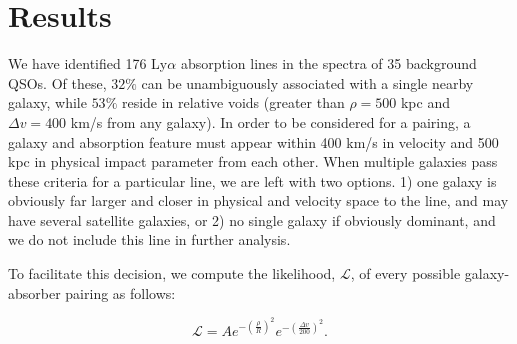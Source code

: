 \documentclass[iop]{emulateapj-rtx4}
\begin{document}
\begin{table}[ht]
\begin{center}
\end{center}
  \caption{\small{All associated systems. The largest $\mathcal{L}$ value is given, where a (\**) indicates $d^{1.5}$ was used, otherwise the quoted $\mathcal{L}$ was computed with $R_{vir}$. For all entries, 'x' indicates unknown values.}}
  \label{target_table}
\end{table}


\section{Results}

We have identified 176 Ly$\alpha$ absorption lines in the spectra of 35 background QSOs. Of these, $32\%$ can be unambiguously associated with a single nearby galaxy, while $53\%$ reside in relative voids (greater than $\rho = 500$ kpc and $\Delta v = 400$ km/s from any galaxy). In order to be considered for a pairing, a galaxy and absorption feature must appear within 400 km/s in velocity and 500 kpc in physical impact parameter from each other. When multiple galaxies pass these criteria for a particular line, we are left with two options. 1) one galaxy is obviously far larger and closer in physical and velocity space to the line, and may have several satellite galaxies, or 2) no single galaxy if obviously dominant, and we do not include this line in further analysis. 

To facilitate this decision, we compute the likelihood, $\mathcal{L}$, of every possible galaxy-absorber pairing as follows:

\begin{equation}
	\mathcal{L} = A e^{-(\frac{\rho}{R})^2} e^{-(\frac{\Delta v}{200})^2}.
\end{equation}
\end{document}
